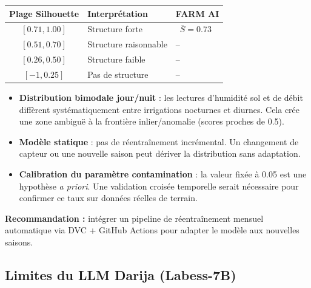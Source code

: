 \documentclass[12pt,a4paper,oneside]{report}
\newcommand{\yes}{\ding{52}}
\begin{document}
\begin{center}
\begin{tabular}{cll}
\toprule
\textbf{Plage Silhouette}&\textbf{Interprétation}&\textbf{FARM AI}\\
\midrule
$[0.71, 1.00]$ & Structure forte       & \yes~$\bar{S} = 0.73$ \\
$[0.51, 0.70]$ & Structure raisonnable & -- \\
$[0.26, 0.50]$ & Structure faible      & -- \\
$[-1,  0.25]$  & Pas de structure      & -- \\
\bottomrule
\end{tabular}
\end{center}

\begin{tcolorbox}[warningbox,title={Limites de l'IsolationForest sur données IoT}]
\begin{itemize}
  \item \textbf{Distribution bimodale jour/nuit} : les lectures d'humidité sol et de
        débit diffèrent systématiquement entre irrigations nocturnes et diurnes. Cela
        crée une zone ambiguë à la frontière inlier/anomalie (scores proches de 0.5).
  \item \textbf{Modèle statique} : pas de réentraînement incrémental. Un changement de
        capteur ou une nouvelle saison peut dériver la distribution sans adaptation.
  \item \textbf{Calibration du paramètre contamination} : la valeur fixée à 0.05 est
        une hypothèse \textit{a priori}. Une validation croisée temporelle serait
        nécessaire pour confirmer ce taux sur données réelles de terrain.
\end{itemize}
\textbf{Recommandation :} intégrer un pipeline de réentraînement mensuel automatique
via DVC + GitHub Actions pour adapter le modèle aux nouvelles saisons.
\end{tcolorbox}

\subsection{Limites du LLM Darija (Labess-7B)}
\end{document}
